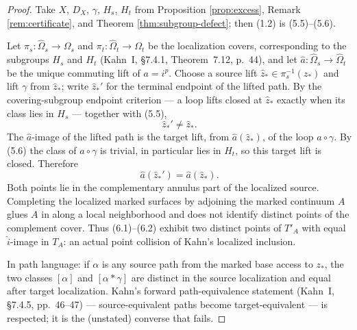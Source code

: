 \begin{proof}
Take \(X\), \(D_X\), \(\gamma\), \(H_s\), \(H_t\) from Proposition \ref{prop:excess}, Remark \ref{rem:certificate}, and Theorem \ref{thm:subgroup-defect}; then (1.2) is (5.5)--(5.6).

Let \(\pi_s\colon\widehat\Omega_s\to\Omega_s\) and \(\pi_t\colon\widehat\Omega_t\to\Omega_t\) be the localization covers, corresponding to the subgroups \(H_s\) and \(H_t\) (Kahn~I, \S7.4.1, Theorem~7.12, p.~44), and let \(\widehat a\colon\widehat\Omega_s\to\widehat\Omega_t\) be the unique commuting lift of \(a=i^p\).  Choose a source lift \(\widehat z_*\in\pi_s^{-1}(z_*)\) and lift \(\gamma\) from \(\widehat z_*\); write \(\widehat z_*'\) for the terminal endpoint of the lifted path.  By the covering-subgroup endpoint criterion --- a loop lifts closed at \(\widehat z_*\) exactly when its class lies in \(H_s\) --- together with (5.5),
\[
 \widehat z_*'\ne\widehat z_*.                        \tag{6.1}
\]
The \(\widehat a\)-image of the lifted path is the target lift, from \(\widehat a(\widehat z_*)\), of the loop \(a\circ\gamma\).  By (5.6) the class of \(a\circ\gamma\) is trivial, in particular lies in \(H_t\), so this target lift is closed.  Therefore
\[
 \widehat a(\widehat z_*')=\widehat a(\widehat z_*).  \tag{6.2}
\]
Both points lie in the complementary annulus part of the localized source.  Completing the localized marked surfaces by adjoining the marked continuum \(A\) glues \(A\) in along a local neighborhood and does not identify distinct points of the complement cover.  Thus (6.1)--(6.2) exhibit two distinct points of \(T'_A\) with equal \(\widehat i\)-image in \(T_A\): an actual point collision of Kahn's localized inclusion.

In path language: if \(\alpha\) is any source path from the marked base access to \(z_*\), the two classes \([\alpha]\) and \([\alpha*\gamma]\) are distinct in the source localization and equal after target localization.  Kahn's forward path-equivalence statement (Kahn~I, \S7.4.5, pp.~46--47) --- source-equivalent paths become target-equivalent --- is respected; it is the (unstated) converse that fails.
\end{proof}

